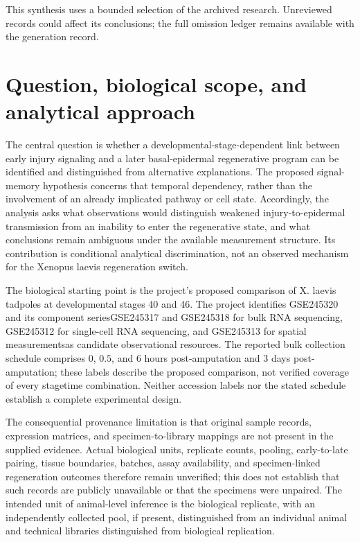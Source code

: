 \documentclass[11pt]{article}
\begin{document}
This synthesis uses a bounded selection of the archived research. Unreviewed records could affect its conclusions; the full omission ledger remains available with the generation record.
\section{Question, biological scope, and analytical approach}
The central question is whether a developmental-stage-dependent link between early injury signaling and a later basal-epidermal regenerative program can be identified and distinguished from alternative explanations. The proposed signal-memory hypothesis concerns that temporal dependency, rather than the involvement of an already implicated pathway or cell state. Accordingly, the analysis asks what observations would distinguish weakened injury-to-epidermal transmission from an inability to enter the regenerative state, and what conclusions remain ambiguous under the available measurement structure. Its contribution is conditional analytical discrimination, not an observed mechanism for the Xenopus laevis regeneration switch.

The biological starting point is the project's proposed comparison of X. laevis tadpoles at developmental stages 40 and 46. The project identifies GSE245320 and its component series\textemdash{}GSE245317 and GSE245318 for bulk RNA sequencing, GSE245312 for single-cell RNA sequencing, and GSE245313 for spatial measurements\textemdash{}as candidate observational resources. The reported bulk collection schedule comprises $0$, $0.5$, and $6$ hours post-amputation and $3$ days post-amputation; these labels describe the proposed comparison, not verified coverage of every stage\textendash{}\allowbreak{}time combination. Neither accession labels nor the stated schedule establish a complete experimental design.

The consequential provenance limitation is that original sample records, expression matrices, and specimen-to-library mappings are not present in the supplied evidence. Actual biological units, replicate counts, pooling, early-to-late pairing, tissue boundaries, batches, assay availability, and specimen-linked regeneration outcomes therefore remain unverified; this does not establish that such records are publicly unavailable or that the specimens were unpaired. The intended unit of animal-level inference is the biological replicate, with an independently collected pool, if present, distinguished from an individual animal and technical libraries distinguished from biological replication.
\end{document}
